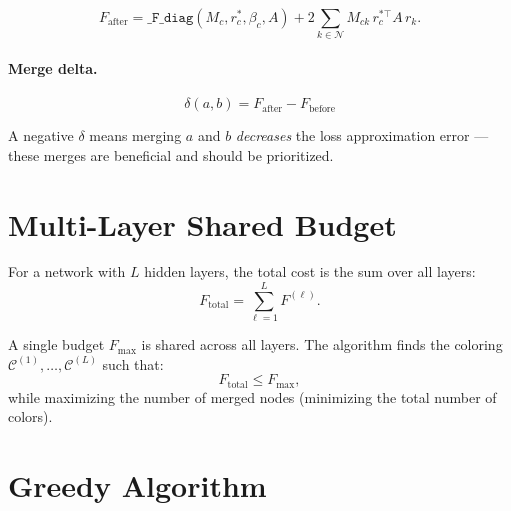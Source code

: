 \documentclass[11pt]{article}
\begin{document}
\begin{equation}
  F_{\mathrm{after}} = \texttt{\_F\_diag}(M_c, r_c^*, \beta_c, A)
                     + 2\sum_{k\in\mathcal{N}} M_{ck}\,r_c^{*\top} A\,r_k.
\end{equation}

\paragraph{Merge delta.}

\begin{equation}
  \boxed{\delta(a, b) = F_{\mathrm{after}} - F_{\mathrm{before}}}
  \label{eq:delta}
\end{equation}

A negative $\delta$ means merging $a$ and $b$ \emph{decreases} the loss
approximation error — these merges are beneficial and should be prioritized.

\section{Multi-Layer Shared Budget}

For a network with $L$ hidden layers, the total cost is the sum over all layers:
\[
  F_{\mathrm{total}} = \sum_{\ell=1}^{L} F^{(\ell)}.
\]

A single budget $F_{\max}$ is shared across all layers. The algorithm finds
the coloring $\mathcal{C}^{(1)}, \ldots, \mathcal{C}^{(L)}$ such that:
\[
  F_{\mathrm{total}} \leq F_{\max},
\]
while maximizing the number of merged nodes (minimizing the total number of colors).

\section{Greedy Algorithm}
\end{document}
